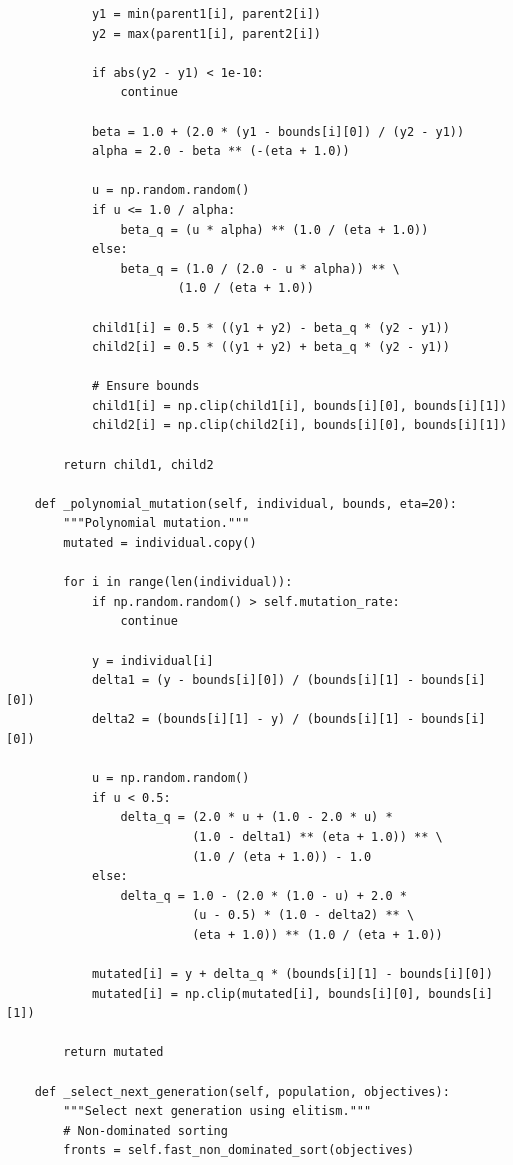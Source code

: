 \begin{lstlisting}
            y1 = min(parent1[i], parent2[i])
            y2 = max(parent1[i], parent2[i])
            
            if abs(y2 - y1) < 1e-10:
                continue
            
            beta = 1.0 + (2.0 * (y1 - bounds[i][0]) / (y2 - y1))
            alpha = 2.0 - beta ** (-(eta + 1.0))
            
            u = np.random.random()
            if u <= 1.0 / alpha:
                beta_q = (u * alpha) ** (1.0 / (eta + 1.0))
            else:
                beta_q = (1.0 / (2.0 - u * alpha)) ** \
                        (1.0 / (eta + 1.0))
            
            child1[i] = 0.5 * ((y1 + y2) - beta_q * (y2 - y1))
            child2[i] = 0.5 * ((y1 + y2) + beta_q * (y2 - y1))
            
            # Ensure bounds
            child1[i] = np.clip(child1[i], bounds[i][0], bounds[i][1])
            child2[i] = np.clip(child2[i], bounds[i][0], bounds[i][1])
        
        return child1, child2
    
    def _polynomial_mutation(self, individual, bounds, eta=20):
        """Polynomial mutation."""
        mutated = individual.copy()
        
        for i in range(len(individual)):
            if np.random.random() > self.mutation_rate:
                continue
            
            y = individual[i]
            delta1 = (y - bounds[i][0]) / (bounds[i][1] - bounds[i][0])
            delta2 = (bounds[i][1] - y) / (bounds[i][1] - bounds[i][0])
            
            u = np.random.random()
            if u < 0.5:
                delta_q = (2.0 * u + (1.0 - 2.0 * u) * 
                          (1.0 - delta1) ** (eta + 1.0)) ** \
                          (1.0 / (eta + 1.0)) - 1.0
            else:
                delta_q = 1.0 - (2.0 * (1.0 - u) + 2.0 * 
                          (u - 0.5) * (1.0 - delta2) ** \
                          (eta + 1.0)) ** (1.0 / (eta + 1.0))
            
            mutated[i] = y + delta_q * (bounds[i][1] - bounds[i][0])
            mutated[i] = np.clip(mutated[i], bounds[i][0], bounds[i][1])
        
        return mutated
    
    def _select_next_generation(self, population, objectives):
        """Select next generation using elitism."""
        # Non-dominated sorting
        fronts = self.fast_non_dominated_sort(objectives)
        

\end{lstlisting}
